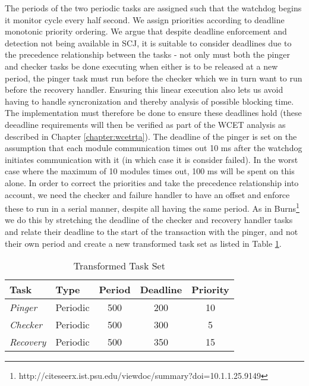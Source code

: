 The periods of the two periodic tasks are assigned such that the watchdog begins it monitor cycle every half second. We assign priorities according to deadline monotonic priority ordering. We argue that despite deadline enforcement and detection not being available in SCJ, it is suitable to consider deadlines due to the precedence relationship between the tasks - not only must both the pinger and checker tasks be done executing when either is to be released at a new period, the pinger task must run before the checker which we in turn want to run before the recovery handler. Ensuring this linear execution also lets us avoid having to handle syncronization and thereby analysis of possible blocking time. The implementation must therefore be done to ensure these deadlines hold (these deeadline requirements will then be verified as part of the WCET analysis as described in Chapter \ref{chapter:wcetrta}). The deadline of the pinger is set on the assumption that each module communication times out 10 ms after the watchdog initiates communication with it (in which case it is consider failed). In the worst case where the maximum of 10 modules times out, 100 ms will be spent on this alone. In order to correct the priorities and take the precedence relationship into account, we need the checker and failure handler to have an offset and enforce these to run in a serial manner, despite all having the same period. As in Burns\footnote{http://citeseerx.ist.psu.edu/viewdoc/summary?doi=10.1.1.25.9149} we do this by stretching the deadline of the checker and recovery handler tasks and relate their deadline to the start of the transaction with the pinger, and not their own period and create a new transformed task set as listed in Table \ref{tab:tasks2}.
\begin{center}
	\begin{table}
    \begin{tabular}{ | l | l | c | c | c |}
    \hline
    Task & Type & Period & Deadline & Priority  \\ \hline
    \textit{Pinger} & Periodic & 500 & 200 & 10  \\ \hline
    \textit{Checker} & Periodic & 500 & 300 & 5 \\ \hline
    \textit{Recovery} & Periodic & 500 & 350 & 15 \\
    \hline
    \end{tabular}
    \label{tab:tasks2}
     \caption{Transformed Task Set}
    \end{table}
\end{center}

